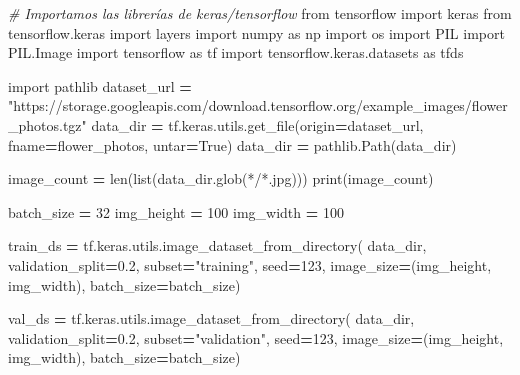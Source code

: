 \documentclass[
  a4paper,
  DIV=11,
  numbers=noendperiod]{scrreprt}
\newenvironment{Shaded}{\begin{snugshade}}{\end{snugshade}}
\newcommand{\BuiltInTok}[1]{#1}
\newcommand{\CommentTok}[1]{\textcolor[rgb]{0.56,0.35,0.01}{\textit{#1}}}
\newcommand{\DecValTok}[1]{\textcolor[rgb]{0.00,0.00,0.81}{#1}}
\newcommand{\FloatTok}[1]{\textcolor[rgb]{0.00,0.00,0.81}{#1}}
\newcommand{\ImportTok}[1]{#1}
\newcommand{\NormalTok}[1]{#1}
\newcommand{\OperatorTok}[1]{\textcolor[rgb]{0.81,0.36,0.00}{\textbf{#1}}}
\newcommand{\StringTok}[1]{\textcolor[rgb]{0.31,0.60,0.02}{#1}}
\newcommand{\VariableTok}[1]{\textcolor[rgb]{0.00,0.00,0.00}{#1}}
\begin{document}
\begin{Shaded}
\begin{Highlighting}[numbers=left,,]
\CommentTok{\# Importamos las librerías de keras/tensorflow}
\ImportTok{from}\NormalTok{ tensorflow }\ImportTok{import}\NormalTok{ keras}
\ImportTok{from}\NormalTok{ tensorflow.keras }\ImportTok{import}\NormalTok{ layers}
\ImportTok{import}\NormalTok{ numpy }\ImportTok{as}\NormalTok{ np}
\ImportTok{import}\NormalTok{ os}
\ImportTok{import}\NormalTok{ PIL}
\ImportTok{import}\NormalTok{ PIL.Image}
\ImportTok{import}\NormalTok{ tensorflow }\ImportTok{as}\NormalTok{ tf}
\ImportTok{import}\NormalTok{ tensorflow.keras.datasets }\ImportTok{as}\NormalTok{ tfds}

\ImportTok{import}\NormalTok{ pathlib}
\NormalTok{dataset\_url }\OperatorTok{=} \StringTok{"https://storage.googleapis.com/download.tensorflow.org/example\_images/flower\_photos.tgz"}
\NormalTok{data\_dir }\OperatorTok{=}\NormalTok{ tf.keras.utils.get\_file(origin}\OperatorTok{=}\NormalTok{dataset\_url,}
\NormalTok{                                   fname}\OperatorTok{=}\StringTok{\textquotesingle{}flower\_photos\textquotesingle{}}\NormalTok{,}
\NormalTok{                                   untar}\OperatorTok{=}\VariableTok{True}\NormalTok{)}
\NormalTok{data\_dir }\OperatorTok{=}\NormalTok{ pathlib.Path(data\_dir)}

\NormalTok{image\_count }\OperatorTok{=} \BuiltInTok{len}\NormalTok{(}\BuiltInTok{list}\NormalTok{(data\_dir.glob(}\StringTok{\textquotesingle{}*/*.jpg\textquotesingle{}}\NormalTok{)))}
\BuiltInTok{print}\NormalTok{(image\_count)}


\NormalTok{batch\_size }\OperatorTok{=} \DecValTok{32}
\NormalTok{img\_height }\OperatorTok{=} \DecValTok{100}
\NormalTok{img\_width }\OperatorTok{=} \DecValTok{100}

\NormalTok{train\_ds }\OperatorTok{=}\NormalTok{ tf.keras.utils.image\_dataset\_from\_directory(}
\NormalTok{  data\_dir,}
\NormalTok{  validation\_split}\OperatorTok{=}\FloatTok{0.2}\NormalTok{,}
\NormalTok{  subset}\OperatorTok{=}\StringTok{"training"}\NormalTok{,}
\NormalTok{  seed}\OperatorTok{=}\DecValTok{123}\NormalTok{,}
\NormalTok{  image\_size}\OperatorTok{=}\NormalTok{(img\_height, img\_width),}
\NormalTok{  batch\_size}\OperatorTok{=}\NormalTok{batch\_size)}

\NormalTok{val\_ds }\OperatorTok{=}\NormalTok{ tf.keras.utils.image\_dataset\_from\_directory(}
\NormalTok{  data\_dir,}
\NormalTok{  validation\_split}\OperatorTok{=}\FloatTok{0.2}\NormalTok{,}
\NormalTok{  subset}\OperatorTok{=}\StringTok{"validation"}\NormalTok{,}
\NormalTok{  seed}\OperatorTok{=}\DecValTok{123}\NormalTok{,}
\NormalTok{  image\_size}\OperatorTok{=}\NormalTok{(img\_height, img\_width),}
\NormalTok{  batch\_size}\OperatorTok{=}\NormalTok{batch\_size)}


\end{Highlighting}
\end{Shaded}
\end{document}
